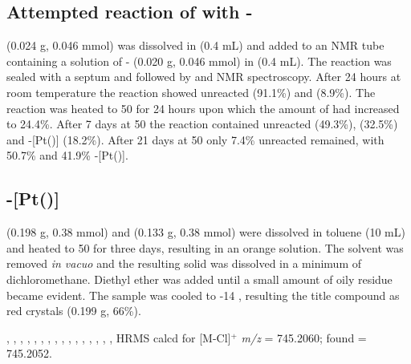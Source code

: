 \subsection*{Attempted reaction of \tButhixantphos with \trans-\ce{[Pt(CN^{t}Bu)2Cl2]}}

\tButhixantphos{} (0.024 g, 0.046 mmol) was dissolved in  (0.4 mL) and added to an NMR tube containing a solution of \trans- (0.020 g, 0.046 mmol) in  (0.4 mL).  The reaction was sealed with a septum and followed by \proton{} and \phosphorus{} NMR spectroscopy.  After 24 hours at room temperature the reaction showed unreacted \tButhixantphos{} (91.1\%) and \tButhixantphos{} (8.9\%).  The reaction was heated to 50 \degC{} for 24 hours upon which the amount of \tButhixantphos{} had increased to 24.4\%.  After 7 days at 50 \degC the reaction contained unreacted \tButhixantphos{} (49.3\%), \tButhixantphos{} (32.5\%) and \trans-[Pt(\tButhixantphos)] (18.2\%).  After 21 days at 50 \degC only 7.4\% unreacted \tButhixantphos remained, with 50.7\% \tButhixantphos{} and 41.9\% \trans-[Pt(\tButhixantphos)].  


\subsection*{\trans{}-[Pt(\tButhixantphos)]}
%

\tBuThixantphos (0.198 g, 0.38 mmol) and \ce{[Pt(C6H10)Cl2]} (0.133 g, 0.38 mmol) were dissolved in toluene (10 mL) and heated to 50 \degC{} for three days, resulting in an orange solution.  The solvent was removed \emph{in vacuo} and the resulting solid was dissolved in a minimum of dichloromethane.  Diethyl ether was added until a small amount of oily residue became evident.  The sample was cooled to -14 \degC, resulting the title compound as red crystals (0.199 g, 66\%).

,
,
,
,
,
,
,
,
,
,
,
,
,
,
,
,
HRMS calcd for  [M-Cl]$^+$ \emph{m/z} = 745.2060; found = 745.2052.

